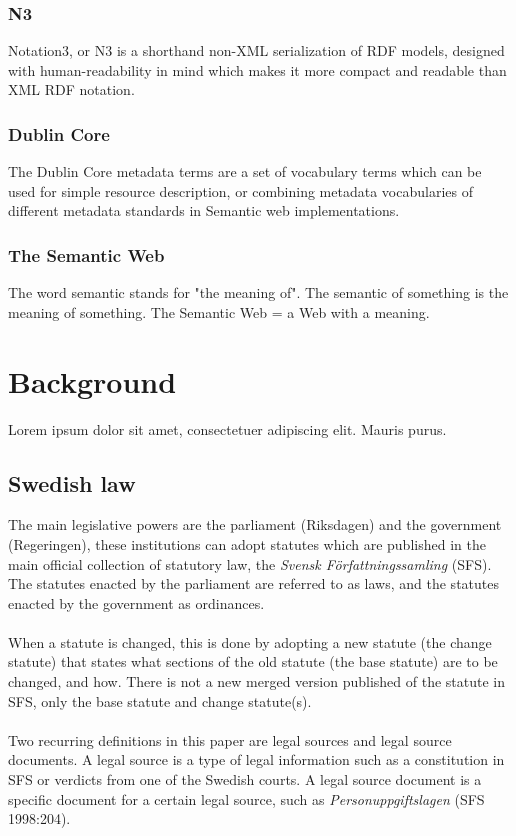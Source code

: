 \documentclass[a4paper,11pt]{kth-mag}
\begin{document}
\subsection*{N3}
Notation3, or N3 is a shorthand non-XML serialization of RDF models,
designed with human-readability in mind which makes it more compact and
readable than XML RDF notation.

\subsection*{Dublin Core}
The Dublin Core metadata terms are a set of vocabulary terms which
can be used for simple resource description, or combining metadata
vocabularies of different metadata standards in Semantic web implementations.

\subsection*{The Semantic Web}
The word semantic stands for "the meaning of". The semantic of something is the meaning of something. The Semantic Web = a Web with a meaning.

\chapter{Background}

Lorem ipsum dolor sit amet, consectetuer adipiscing elit. Mauris
purus. 

\section{Swedish law}
The main legislative powers are the parliament (Riksdagen) and the government (Regeringen), these institutions can adopt statutes which are published in the main official collection of statutory law, the \textit{Svensk Författningssamling} (SFS). The statutes enacted by the parliament are referred to as laws, and the statutes enacted by the government as ordinances.\\\\
When a statute is changed, this is done by adopting a new statute (the change statute) that states what sections of the old statute (the base statute) are to be changed, and how. There is not a new merged version published of the statute in SFS, only the base statute and change statute(s).\\\\
Two recurring definitions in this paper are legal sources and legal source documents. A legal source is a type of legal information such as a constitution in SFS or verdicts from one of the Swedish courts. A legal source document is a specific document for a certain legal source, such as \textit{Personuppgiftslagen} (SFS 1998:204). 
\end{document}
